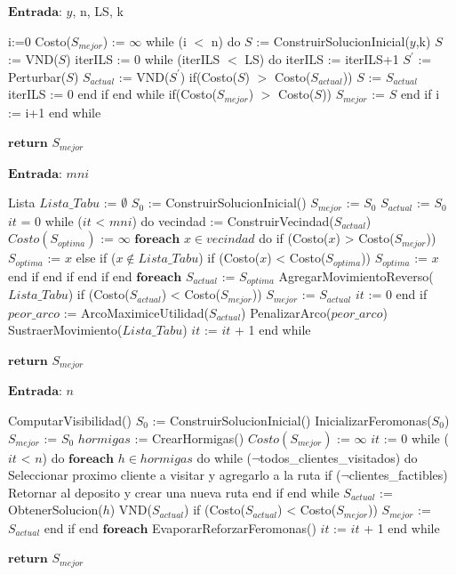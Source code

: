 \begin{code}[includerangemarker=false,frame=single,label=alg:ILS-VND-M,caption=Pseudocódigo de ILS-VND-M,firstnumber=100, mathescape]
$\textbf{Entrada}$: $y$, n, LS, k

i:=0
Costo($S_{mejor}$) := $\infty$
while (i $<$ n) do
	$S$ := ConstruirSolucionInicial($y$,k)
	$S$ := VND($S$)		
	iterILS := 0
	while (iterILS $<$ LS) do
		iterILS := iterILS+1
		$S^{'}$ := Perturbar($S$)
		$S_{actual}$ := VND($S^{'}$)	
		if(Costo($S$) $>$ Costo($S_{actual}$))		
			$S$ := $S_{actual}$
			iterILS := 0		
		end if									
	end while
	if(Costo($S_{mejor}$) $>$ Costo($S$))		
		$S_{mejor}$ := $S$		
	end if			
	i := i+1
end while

$\textbf{return}$ $S_{mejor}$	
\end{code}

\begin{code}[includerangemarker=false,frame=single,label=alg:GTS,caption=Pseudocódigo de GTS-M,firstnumber=100, mathescape]
$\textbf{Entrada}$: $mni$

Lista $Lista\_Tabu$ := $\emptyset$
$S_0$ := ConstruirSolucionInicial()
$S_{mejor}$ := $S_0$
$S_{actual}$ := $S_0$
$it$ = 0
while ($it$ < $mni$) do
	vecindad := ConstruirVecindad($S_{actual}$)
	$Costo(S_{optima})$ := $\infty$ 			
	$\textbf{foreach}$ $x \in vecindad$ do
		if (Costo($x$) > Costo($S_{mejor}$))
			$S_{optima}$ := $x$
		else
			if ($x \notin Lista\_Tabu$)
				if (Costo($x$) < Costo($S_{optima}$))
					$S_{optima}$ := $x$
				end if
			end if
		end if
	end $\textbf{foreach}$
	$S_{actual}$ := $S_{optima}$
	AgregarMovimientoReverso($Lista\_Tabu$)
	if (Costo($S_{actual}$) < Costo($S_{mejor}$))
		$S_{mejor}$ := $S_{actual}$
		$it$ := 0
	end if	
	$peor\_arco$ := ArcoMaximiceUtilidad($S_{actual}$)
	PenalizarArco($peor\_arco$)
	SustraerMovimiento($Lista\_Tabu$)
	$it$ := $it$ + 1
end while

$\textbf{return}$ $S_{mejor}$	
\end{code}

\begin{code}[includerangemarker=false,frame=single,label=alg:MACO,caption=Pseudocódigo de AS-M,firstnumber=100, mathescape]
$\textbf{Entrada}$: $n$

ComputarVisibilidad()
$S_0$ := ConstruirSolucionInicial()
InicializarFeromonas($S_0$)
$S_{mejor}$ := $S_0$
$hormigas$ := CrearHormigas()
$Costo(S_{mejor})$ := $\infty$ 
$it$ := 0
while ($it$ < $n$) do
	$\textbf{foreach}$ $h \in hormigas$ do
		while ($\neg$todos_clientes_visitados) do
			Seleccionar proximo cliente a visitar y agregarlo a la ruta
			if ($\neg$clientes_factibles)
				Retornar al deposito y crear una nueva ruta
			end if
		end while
		$S_{actual}$ := ObtenerSolucion($h$)
		VND($S_{actual}$)
		if (Costo($S_{actual}$) < Costo($S_{mejor}$))
			$S_{mejor}$ := $S_{actual}$
		end if
	end $\textbf{foreach}$
	EvaporarReforzarFeromonas()
	$it$ := $it$ + 1
end while

$\textbf{return}$ $S_{mejor}$	
\end{code}

